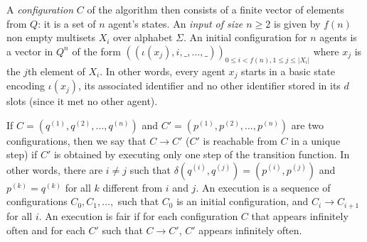 \documentclass[UKenglish]{llncs}
\begin{document}
A \emph{configuration} $C$ of the algorithm then consists of a finite vector of
elements from $Q$:  it is a set of $n$ agent's states.
An \emph{input of size $n\ge2$} is given by $f(n)$ non empty multisets $X_i$
over alphabet $\Sigma$.
An initial configuration for $n$ agents is a vector in $Q^n$
of the form $((\iota(x_j),i,\_,\dots,\_))_{0\le i < f(n), 1\le j\le \left|X_i\right|}$
where $x_j$ is the $j$th element of $X_i$. In other words, every agent $x_j$
starts in a basic state encoding $\iota(x_j)$, its associated
identifier  and
no other identifier stored in its $d$ slots (since it met no other agent). 



 If $C=(q^{(1)},q^{(2)},\dots,q^{(n)})$ and $C'=(p^{(1)},p^{(2)},\dots,p^{(n)})$ are two
configurations, then we say that $C \to C'$ ($C'$ is reachable from $C$
in a unique step) if  $C'$ is obtained by executing only one step of the transition function. In other words,  there are $i \neq j$ such that
$\delta(q^{(i)},q^{(j)})=(p^{(i)},p^{(j)})$ and $p^{(k)}=q^{(k)}$ for all $k$ different
from $i$ and $j$. An execution is a sequence of configurations $C_0,
C_1, \dots,$ such that $C_0$ is an initial configuration, and $C_i
\to C_{i+1}$ for all $i$. An execution is fair if for each
configuration $C$ that appears infinitely often and for each $C'$
such that $C \to C'$, $C'$ appears infinitely often.
 
\end{document}
